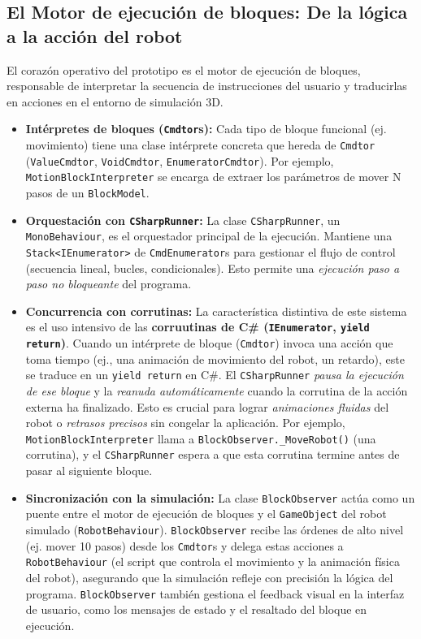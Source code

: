 \subsection{El Motor de ejecución de bloques: De la lógica a la acción del robot}
El corazón operativo del prototipo es el motor de ejecución de bloques, responsable de interpretar la secuencia de instrucciones del usuario y traducirlas en acciones en el entorno de simulación 3D.
\begin{itemize}
	\item \textbf{Intérpretes de bloques (\texttt{Cmdtor}s):} Cada tipo de bloque funcional (ej. movimiento) tiene una clase intérprete concreta que hereda de \texttt{Cmdtor} (\texttt{ValueCmdtor}, \texttt{VoidCmdtor}, \texttt{EnumeratorCmdtor}). Por ejemplo, \texttt{MotionBlockInterpreter} se encarga de extraer los parámetros de mover N pasos de un \texttt{BlockModel}.
	\item \textbf{Orquestación con \texttt{CSharpRunner}:} La clase \texttt{CSharpRunner}, un \texttt{MonoBehaviour}, es el orquestador principal de la ejecución. Mantiene una \texttt{Stack<IEnumerator>} de \texttt{CmdEnumerator}s para gestionar el flujo de control (secuencia lineal, bucles, condicionales). Esto permite una \textit{ejecución paso a paso no bloqueante} del programa.
	\item \textbf{Concurrencia con corrutinas:} La característica distintiva de este sistema es el uso intensivo de las \textbf{corruutinas de C\# (\texttt{IEnumerator}, \texttt{yield return})}. Cuando un intérprete de bloque (\texttt{Cmdtor}) invoca una acción que toma tiempo (ej., una animación de movimiento del robot, un retardo), este se traduce en un \texttt{yield return} en C\#. El \texttt{CSharpRunner} \textit{pausa la ejecución de ese bloque} y la \textit{reanuda automáticamente} cuando la corrutina de la acción externa ha finalizado. Esto es crucial para lograr \textit{animaciones fluidas} del robot o \textit{retrasos precisos} sin congelar la aplicación. Por ejemplo, \texttt{MotionBlockInterpreter} llama a \texttt{BlockObserver.\_MoveRobot()} (una corrutina), y el \texttt{CSharpRunner} espera a que esta corrutina termine antes de pasar al siguiente bloque.
	
	\item \textbf{Sincronización con la simulación:} La clase \texttt{BlockObserver} actúa como un puente entre el motor de ejecución de bloques y el \texttt{GameObject} del robot simulado (\texttt{RobotBehaviour}). \texttt{BlockObserver} recibe las órdenes de alto nivel (ej. mover 10 pasos) desde los \texttt{Cmdtor}s y delega estas acciones a \texttt{RobotBehaviour} (el script que controla el movimiento y la animación física del robot), asegurando que la simulación refleje con precisión la lógica del programa. \texttt{BlockObserver} también gestiona el feedback visual en la interfaz de usuario, como los mensajes de estado y el resaltado del bloque en ejecución.
\end{itemize}


